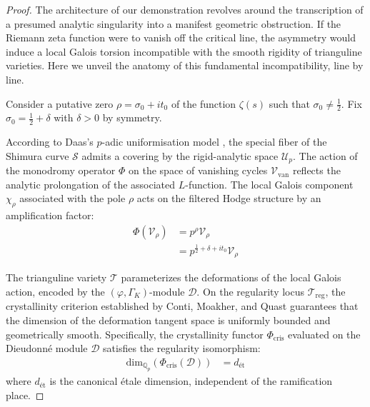 \documentclass[
]{article}
\begin{document}
\begin{proof}
The architecture of our demonstration revolves around the transcription of a presumed analytic singularity into a manifest geometric obstruction. If the Riemann zeta function were to vanish off the critical line, the asymmetry would induce a local Galois torsion incompatible with the smooth rigidity of trianguline varieties. Here we unveil the anatomy of this fundamental incompatibility, line by line.

Consider a putative zero $\rho = \sigma_0 + it_0$ of the function $\zeta(s)$ such that $\sigma_0 \neq \frac{1}{2}$. Fix $\sigma_0 = \frac{1}{2} + \delta$ with $\delta > 0$ by symmetry.

According to Daas's $p$-adic uniformisation model \cite{daas2026}, the special fiber of the Shimura curve $\mathcal{S}$ admits a covering by the rigid-analytic space $\mathcal{U}_p$. The action of the monodromy operator $\Phi$ on the space of vanishing cycles $\mathcal{V}_{\text{van}}$ reflects the analytic prolongation of the associated $L$-function. The local Galois component $\chi_\rho$ associated with the pole $\rho$ acts on the filtered Hodge structure by an amplification factor:
\begin{align*}
    \Phi(\mathcal{V}_{\rho}) &= p^{\rho} \mathcal{V}_{\rho} \\
    &= p^{\frac{1}{2} + \delta + it_0} \mathcal{V}_{\rho}
\end{align*}

The trianguline variety $\mathcal{T}$ parameterizes the deformations of the local Galois action, encoded by the $(\varphi, \Gamma_K)$-module $\mathcal{D}$. On the regularity locus $\mathcal{T}_{\text{reg}}$, the crystallinity criterion established by Conti, Moakher, and Quast \cite{conti2026} guarantees that the dimension of the deformation tangent space is uniformly bounded and geometrically smooth. Specifically, the crystallinity functor $\Phi_{\text{cris}}$ evaluated on the Dieudonné module $\mathcal{D}$ satisfies the regularity isomorphism:
\begin{align*}
    \text{dim}_{\mathbb{Q}_p} \left( \Phi_{\text{cris}}(\mathcal{D}) \right) &= d_{\text{ét}}
\end{align*}
where $d_{\text{ét}}$ is the canonical étale dimension, independent of the ramification place.


\end{proof}
\end{document}
